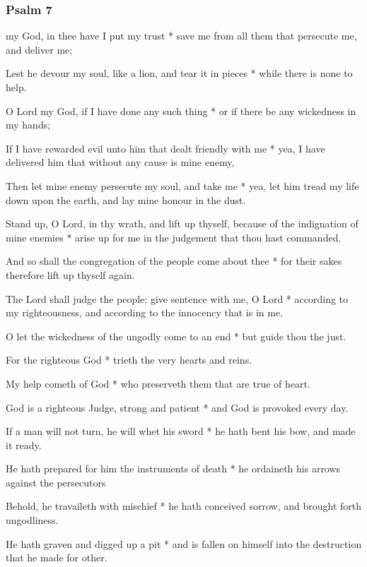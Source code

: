 \subsubsection{Psalm 7}


 my God, in thee have I put my trust * save me from all them that persecute me, and deliver me;

Lest he devour my soul, like a lion, and tear it in pieces * while there is none to help.

O Lord my God, if I have done any such thing * or if there be any wickedness in my hands;

If I have rewarded evil unto him that dealt friendly with me * yea, I have delivered him that without any cause is mine enemy,

Then let mine enemy persecute my soul, and take me * yea, let him tread my life down upon the earth, and lay mine honour in the dust.

Stand up, O Lord, in thy wrath, and lift up thyself, because of the indignation of mine enemies * arise up for me in the judgement that thou hast commanded.

And so shall the congregation of the people come about thee * for their sakes therefore lift up thyself again.

The Lord shall judge the people; give sentence with me, O Lord * according to my righteousness, and according to the innocency that is in me.

O let the wickedness of the ungodly come to an end * but guide thou the just.

For the righteous God * trieth the very hearts and reins.

My help cometh of God * who preserveth them that are true of heart.

God is a righteous Judge, strong and patient * and God is provoked every day.

If a man will not turn, he will whet his sword * he hath bent his bow, and made it ready.

He hath prepared for him the instruments of death * he ordaineth his arrows against the persecutors

Behold, he travaileth with mischief * he hath conceived sorrow, and brought forth ungodliness.

He hath graven and digged up a pit * and is fallen on himself into the destruction that he made for other.

